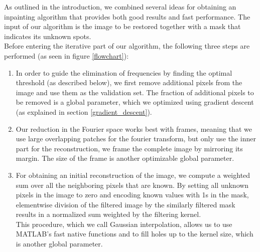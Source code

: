 \documentclass[10pt,conference,compsocconf]{IEEEtran}
\begin{document}
As outlined in the introduction, we combined several ideas for obtaining an inpainting algorithm that provides both good results and fast performance. The input of our algorithm is the image to be restored together with a mask that indicates its unknown spots.\\
Before entering the iterative part of our algorithm, the following three steps are performed (as seen in figure \ref{flowchart}):
\begin{enumerate}
\item In order to guide the elimination of frequencies by finding the optimal threshold (as described below), we first remove additional pixels from the image and use them as the validation set. The fraction of additional pixels to be removed is a global parameter, which we optimized using gradient descent (as explained in section \ref{gradient_descent}).
\item Our reduction in the Fourier space works best with frames, meaning that we use large overlapping patches for the fourier transform, but only use the inner part for the reconstruction, we frame the complete image by mirroring its margin. The size of the frame is another optimizable global parameter.
\item For obtaining an initial reconstruction of the image, we compute a weighted sum over all the neighboring pixels that are known. By setting all unknown pixels in the image to zero and encoding known values with 1s in the mask, elementwise division of the filtered image by the similarly filtered mask results in a normalized sum weighted by the filtering kernel.\\
This procedure, which we call Gaussian interpolation, allows us to use MATLAB's fast native functions and to fill holes up to the kernel size, which is another global parameter.
\label{gaussian_interpolation}
\end{enumerate}
\end{document}
